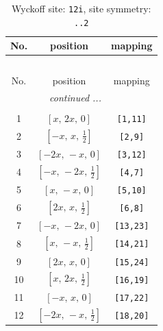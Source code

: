 \documentclass[fleqn,8pt]{jsarticle}
\begin{document}
\begin{longtable}{ccc}
\caption{Wyckoff site: {\tt 12i}, site symmetry: {\tt ..2}}
 \\
 \hline \hline
No. & position & mapping \\ \hline \endfirsthead

\multicolumn{2}{l}{\tablename\ \thetable{}} \\
 \hline \hline
No. & position & mapping \\ \hline \endhead

 \hline \hline
\multicolumn{2}{r}{\footnotesize\it continued ...} \\ \endfoot

 \hline \hline
\multicolumn{2}{r}{} \\ \endlastfoot

1 & $\left[ x,\, 2 x,\, 0 \right]$ & {\tt [1,11]} \\ \hline
2 & $\left[ - x,\, x,\, \frac{1}{2} \right]$ & {\tt [2,9]} \\ \hline
3 & $\left[ - 2 x,\, - x,\, 0 \right]$ & {\tt [3,12]} \\ \hline
4 & $\left[ - x,\, - 2 x,\, \frac{1}{2} \right]$ & {\tt [4,7]} \\ \hline
5 & $\left[ x,\, - x,\, 0 \right]$ & {\tt [5,10]} \\ \hline
6 & $\left[ 2 x,\, x,\, \frac{1}{2} \right]$ & {\tt [6,8]} \\ \hline
7 & $\left[ - x,\, - 2 x,\, 0 \right]$ & {\tt [13,23]} \\ \hline
8 & $\left[ x,\, - x,\, \frac{1}{2} \right]$ & {\tt [14,21]} \\ \hline
9 & $\left[ 2 x,\, x,\, 0 \right]$ & {\tt [15,24]} \\ \hline
10 & $\left[ x,\, 2 x,\, \frac{1}{2} \right]$ & {\tt [16,19]} \\ \hline
11 & $\left[ - x,\, x,\, 0 \right]$ & {\tt [17,22]} \\ \hline
12 & $\left[ - 2 x,\, - x,\, \frac{1}{2} \right]$ & {\tt [18,20]} \\
\end{longtable}
\renewcommand{\arraystretch}{1.2}
\end{document}
